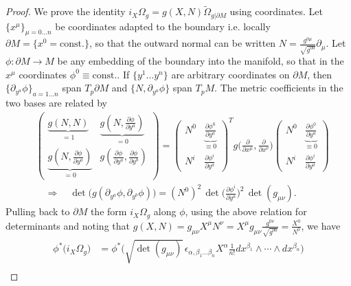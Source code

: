 \documentclass[../geometry_main.tex]{subfiles}
\begin{document}
\begin{proof}
We prove the identity $i_X \Omega_g = g(X,N) \tilde{\Omega}_{g|\partial M}$ using coordinates.
Let $\{x^\mu\}_{\mu=0\dots n}$ be coordinates adapted to the boundary i.e. locally $\partial M=\{x^0 = \text{const.}\}$, so that the outward normal can be written $N = \frac{g^{0\mu}}{\sqrt{g^{00}}} \partial_\mu$.
Let $\phi:\partial M \to M$ be any embedding of the boundary into the manifold, so that in the $x^\mu$ coordinates $\phi^0\equiv \text{const.}$.
If $\{y^1\dots y^n\}$ are arbitrary coordinates on $\partial M$, then $\{\partial_{y^a}\phi\}_{a=1\dots n}$ span $T_p \partial M$ and $\{N, \partial_{y^a}\phi\}$ span $T_p M$.
The metric coefficients in the two bases are related by
{\small\begin{align}
    &\begin{pmatrix}
    \underbrace{g(N,N)}_{=1} & \underbrace{g(N, \tfrac{\partial \phi}{\partial y^a})}_{=0} \\
    \underbrace{g(N, \tfrac{\partial \phi}{\partial y^a})}_{=0} & g(\tfrac{\partial \phi}{\partial y^a}, \tfrac{\partial \phi}{\partial y^b})
    \end{pmatrix}
    = \begin{pmatrix}
    N^0 & \underbrace{\tfrac{\partial \phi^0}{\partial y^a}}_{\equiv 0}
    \\
    N^i & \tfrac{\partial \phi^i}{\partial y^a}
    \end{pmatrix}^T g\Big(\tfrac{\partial}{\partial x^\mu}, \tfrac{\partial}{\partial x^\nu}\Big)
    \begin{pmatrix}
    N^0 &  \underbrace{\tfrac{\partial \phi^0}{\partial y^a}}_{\equiv 0}
    \\
    N^i & \tfrac{\partial \phi^i}{\partial y^a}
    \end{pmatrix}\\[4pt]
    &\quad 
     \Rightarrow\quad \det \big(g(\partial_{y^a} \phi, \partial_{y^b} \phi)\big) = (N^0)^2\, \det\big(\tfrac{\partial \phi^i}{\partial y^a}\big)^2\, \det(g_{\mu \nu}).
\end{align}}
Pulling back to $\partial M$ the form $i_X \Omega_g$ along $\phi$, using the above relation for determinants and noting that $g(X,N)= g_{\mu\nu}X^\mu N^\nu = X^\mu g_{\mu\nu} \tfrac{g^{0\nu}}{\sqrt{g^{00}}}= \tfrac{X^0}{N^0}$, we have
{\small
\begin{align}
    \phi^*\Big(i_X\Omega_g\Big) &= \phi^*\Big( \sqrt{\det(g_{\mu \nu})}\, \epsilon_{\alpha,\beta_1\dots\beta_n} X^\alpha \frac{1}{n!} dx^{\beta_1} \wedge \cdots \wedge dx^{\beta_n} \Big)\\

\end{align}}
\end{proof}
\end{document}
